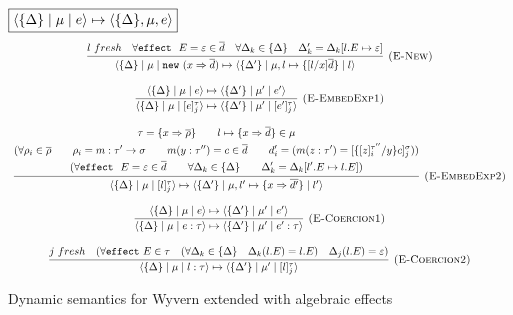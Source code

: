 \begin{figure}[t]
\footnotesize{
\noindent$\fbox{$\langle \{\Delta\} \mid \mu \mid e \rangle \mapsto \langle \{\Delta\}, \mu, e \rangle$}$
\[
\begin{array}{c}

\infer[\textsc{(E-New)}]
	{\langle \{\Delta\}\mid \mu \mid \keyw{new}(x \Rightarrow \overline{d}) \mapsto \langle \{\Delta'\}\mid \mu, l \mapsto \{ [l/x] \overline{d} \} \mid l\rangle }
	{l\ fresh & \forall \keyw{effect}\ E = \varepsilon \in \overline{d} 
	& \forall \Delta_k \in \{\Delta\} & \Delta_k' = \Delta_k[l.E \mapsto \varepsilon] } \\[3ex]
	
\infer[\textsc{(E-EmbedExp1)}]
	{\langle \{\Delta\} \mid \mu \mid [e]^\tau_j \rangle \mapsto    \langle \{\Delta'\} \mid \mu' \mid [e']^\tau_j \rangle}
	{\langle \{\Delta\} \mid \mu \mid e \rangle \mapsto    \langle \{\Delta'\} \mid \mu' \mid e' \rangle }\\[3ex]
  
\infer[\textsc{(E-EmbedExp2)}]
	{\langle \{\Delta\} \mid \mu \mid [l]^\tau_j \rangle \mapsto    \langle \{\Delta'\} \mid \mu, l' \mapsto \{x \Rightarrow \overline{d'}\}  \mid l' \rangle}
	{\begin{gathered}
	  \tau = \{x \Rightarrow \overline{\rho} \} \qquad l \mapsto \{x \Rightarrow \overline{d} \}\in \mu \\
	 (\forall \rho_i \in \overline{\rho}  \qquad
	  \rho_i = m : \tau' \rightarrow \sigma  \qquad
	  m(y:\tau'') = c \in \overline{d} \qquad
	  d'_i = (m(z : \tau') = [\{[z]^{\tau''}_i/y\}c]^\sigma_j )) \\
	  (\forall \keyw{effect}\ E  = \varepsilon \in \overline{d} \qquad  \forall \Delta_k \in \{\Delta\} 
	  \qquad \Delta_k' = \Delta_k[l'.E \mapsto l.E])
	  \end{gathered} } \\[3ex]
\infer[\textsc{(E-Coercion1)}]
	{\langle \{\Delta\} \mid \mu \mid e : \tau \rangle \mapsto \langle \{\Delta'\} \mid \mu' \mid e' : \tau \rangle}
	{\langle \{\Delta\} \mid \mu \mid e  \rangle \mapsto \langle \{\Delta'\} \mid \mu' \mid e'  \rangle} \\[3ex]

\infer[\textsc{(E-Coercion2)}]
	{\langle \{\Delta\} \mid \mu \mid l : \tau \rangle \mapsto \langle \{\Delta'\} \mid \mu' \mid [l]^\tau_j \rangle}
	{j\ fresh & (\forall \keyw{effect} E \in \tau & ( \forall \Delta_k \in \{\Delta\} & \Delta_k(l.E) = l.E) & \Delta_j(l.E) = \varepsilon) }
\end{array}
\]
\label{dyn-wyv}
\caption{Dynamic semantics for Wyvern extended with algebraic effects}
}
\end{figure}



